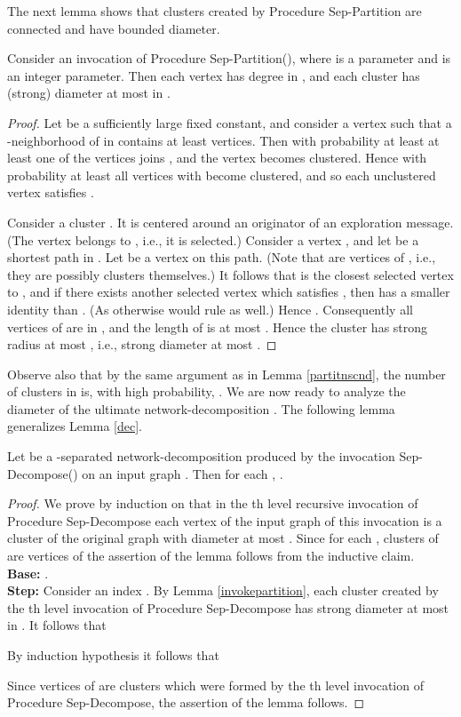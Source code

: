 \documentclass[11pt]{article}
\begin{document}
The next lemma shows that clusters created by Procedure Sep-Partition are connected and have bounded diameter.
\begin{lem} \label{invokepartition}
Consider an invocation of Procedure Sep-Partition(), where  is a parameter and  is an integer parameter. Then each vertex  has degree  in , and each cluster  has (strong) diameter at most  in .
\end{lem}
\begin{proof}
Let  be a sufficiently large fixed constant, and consider a vertex  such that a -neighborhood  of  in  contains at least  vertices. Then with probability at least  at least one of the vertices  joins , and the vertex  becomes clustered. Hence with probability at least  all vertices  with  become clustered, and so each unclustered vertex  satisfies .

Consider a cluster . It is centered around an originator  of an exploration message. (The vertex  belongs to , i.e., it is selected.) Consider a vertex , and let  be a shortest  path in . Let  be a vertex on this path. (Note that  are vertices of , i.e., they are possibly clusters themselves.) It follows that  is the closest selected vertex to , and if there exists another selected vertex  which satisfies , then  has a smaller identity than . (As otherwise  would rule  as well.) Hence . Consequently all vertices of  are in , and the length of  is at most . Hence the cluster  has strong radius at most , i.e., strong diameter at most .
\end{proof}
Observe also that by the same argument as in Lemma \ref{partitnscnd}, the number of clusters in  is, with high probability, . We are now ready to analyze the diameter  of the ultimate network-decomposition . The following lemma generalizes Lemma \ref{dec}.
\begin{lem}
Let  be a -separated network-decomposition produced by the invocation Sep-Decompose() on an input graph . Then for each , .
\end{lem}
\begin{proof}
We prove by induction on  that in the th level recursive invocation of Procedure Sep-Decompose each vertex  of the input graph  of this invocation is a cluster of the original graph  with diameter at most .
Since for each , clusters of  are vertices of  the assertion of the lemma follows from the inductive claim.\\
{\bf Base:} .\\
{\bf Step:} Consider an index . By Lemma \ref{invokepartition}, each cluster  created by the th level invocation of Procedure Sep-Decompose has strong diameter at most  in . It follows that

By induction hypothesis it follows that

Since vertices  of  are clusters which were formed by the th level invocation of Procedure Sep-Decompose, the assertion of the lemma follows.
\end{proof}
\end{document}
